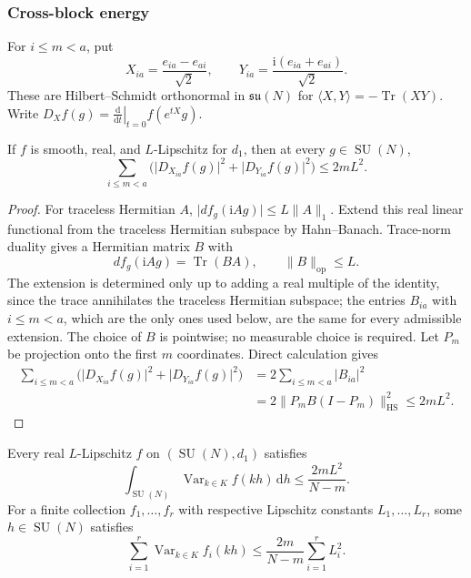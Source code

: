 \subsubsection{Cross-block energy}

For $i\le m<a$, put
\[
X_{ia}=\frac{e_{ia}-e_{ai}}{\sqrt2},\qquad
Y_{ia}=\frac{\mathrm i(e_{ia}+e_{ai})}{\sqrt2}.
\]
These are Hilbert--Schmidt orthonormal in $\mathfrak{su}(N)$ for
$\langle X,Y\rangle=-\operatorname{Tr}(XY)$. Write
$D_Xf(g)=\left.\frac{\mathrm d}{\mathrm dt}\right|_{t=0}f(e^{tX}g)$.

\begin{lemma}\label{lem:ind-energy}
If $f$ is smooth, real, and $L$-Lipschitz for $d_1$, then at every
$g\in\operatorname{SU}(N)$,
\begin{equation}\label{eq:ind-energy-bound}
\sum_{i\le m<a}\bigl(\lvert D_{X_{ia}}f(g)\rvert^2+
\lvert D_{Y_{ia}}f(g)\rvert^2\bigr)\le2mL^2.
\end{equation}
\end{lemma}

\begin{proof}
For traceless Hermitian $A$,
$\lvert df_g(\mathrm iAg)\rvert\le L\lVert A\rVert_1$.
Extend this real linear functional from the traceless Hermitian
subspace by Hahn--Banach. Trace-norm duality gives a Hermitian
matrix $B$ with
\[
df_g(\mathrm iAg)=\operatorname{Tr}(BA),\qquad \lVert B\rVert_{\mathrm{op}}\le L.
\]
The extension is determined only up to adding a real multiple of the
identity, since the trace annihilates the traceless Hermitian subspace;
the entries $B_{ia}$ with $i\le m<a$, which are the only ones used
below, are the same for every admissible extension. The choice of $B$ is
pointwise; no measurable choice is required.
Let $P_m$ be projection onto the first $m$ coordinates. Direct
calculation gives
\begin{align*}
\sum_{i\le m<a}\bigl(\lvert D_{X_{ia}}f(g)\rvert^2+
\lvert D_{Y_{ia}}f(g)\rvert^2\bigr)
&=2\sum_{i\le m<a}\lvert B_{ia}\rvert^2\\
&=2\lVert P_mB(I-P_m)\rVert_{\mathrm{HS}}^2\le2mL^2.
\end{align*}
\end{proof}

\begin{theorem}\label{thm:ind-variance}
Every real $L$-Lipschitz $f$ on $(\operatorname{SU}(N),d_1)$ satisfies
\begin{equation}\label{eq:ind-variance}
\int_{\operatorname{SU}(N)}\operatorname{Var}_{k\in K}f(kh)\,\mathrm d h\le\frac{2mL^2}{N-m}.
\end{equation}
For a finite collection $f_1,\ldots,f_r$ with respective Lipschitz
constants $L_1,\ldots,L_r$, some $h\in\operatorname{SU}(N)$ satisfies
\begin{equation}\label{eq:ind-finite-variance}
\sum_{i=1}^r\operatorname{Var}_{k\in K}f_i(kh)
\le\frac{2m}{N-m}\sum_{i=1}^rL_i^2.
\end{equation}
\end{theorem}

